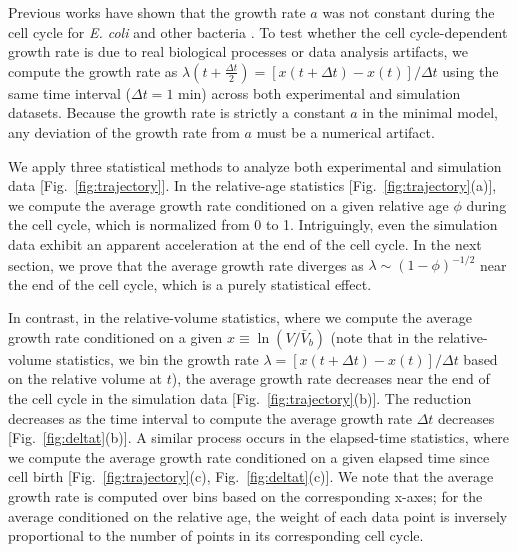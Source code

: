 \documentclass[aps, prl, longbibliography, linenumbers, superscriptaddress]{revtex4-2}
\newcommand{\blue}{\color{blue}}
\newcommand{\blue}{}
\begin{document}
{\blue Previous works have shown that the growth rate $a$ was not constant during the cell cycle for {\it E. coli} and other bacteria \cite{Kar2021distinguishing, Cylke2023super, Cylke2025gene}. To test whether the cell cycle-dependent growth rate is due to real biological processes or data analysis artifacts, we compute the growth rate as $\lambda (t+\frac{\Delta t}{2}) = [x(t+\Delta t) - x(t)]/\Delta t$ using the same time interval ($\Delta t = 1$ min) across both experimental and simulation datasets. Because the growth rate is strictly a constant $a$ in the minimal model, any deviation of the growth rate from $a$ must be a numerical artifact.

We apply three statistical methods to analyze both experimental and simulation data [Fig.~\ref{fig:trajectory}]. In the relative-age statistics [Fig.~\ref{fig:trajectory}(a)], we compute the average growth rate conditioned on a given relative age $\phi$ during the cell cycle, which is normalized from 0 to 1. Intriguingly, even the simulation data exhibit an apparent acceleration at the end of the cell cycle. In the next section, we prove that the average growth rate diverges as $\lambda \sim (1-\phi)^{-1/2}$ near the end of the cell cycle, which is a purely statistical effect.

In contrast, in the relative-volume statistics, where we compute the average growth rate conditioned on a given $x\equiv \ln(V/\bar{V}_b)$ (note that in the relative-volume statistics, we bin the growth rate $\lambda = [x(t+\Delta t) - x(t)]/\Delta t$ based on the relative volume at $t$), the average growth rate decreases near the end of the cell cycle in the simulation data [Fig.~\ref{fig:trajectory}(b)]. The reduction decreases as the time interval to compute the average growth rate $\Delta t$ decreases [Fig.~\ref{fig:deltat}(b)]. A similar process occurs in the elapsed-time statistics, where we compute the average growth rate conditioned on a given elapsed time since cell birth [Fig.~\ref{fig:trajectory}(c), Fig.~\ref{fig:deltat}(c)]. We note that the average growth rate is computed over bins based on the corresponding x-axes; for the average conditioned on the relative age, the weight of each data point is inversely proportional to the number of points in its corresponding cell cycle.}
\end{document}
